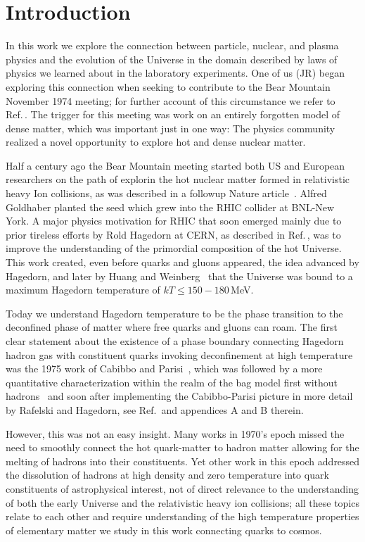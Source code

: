 \section{Introduction}
\label{sec:Intro}
In this work we explore the connection between particle, nuclear, and plasma physics and the evolution of the Universe in the domain described by laws of physics we learned about in the laboratory experiments. One of us (JR) began exploring this connection when seeking to contribute to the Bear Mountain November 1974 meeting; for further account of this circumstance we refer to Ref.\,\cite{Rafelski:2019twp}. The trigger for this meeting was work on an entirely forgotten model of dense matter, which was important just in one way: The physics community realized a novel opportunity to explore hot and dense nuclear matter.

Half a century ago the Bear Mountain meeting started both US and European researchers on the path of explorin the hot nuclear matter formed in relativistic heavy Ion collisions, as was described in a followup Nature article~\cite{Goldhaber:1978qp}. Alfred Goldhaber planted the seed which grew into the RHIC collider at BNL-New York. A  major physics motivation for RHIC that soon emerged mainly due to prior tireless efforts by Rold Hagedorn at CERN, as described in Ref.\,\cite{Rafelski:2016hnq}, was to improve  the understanding of the primordial composition of the hot Universe. This work created, even before quarks and gluons appeared, the idea advanced by Hagedorn, and later by Huang and Weinberg~\cite{Huang:1970iq} that the Universe was bound to a maximum Hagedorn temperature of $kT\le 150-180$\,MeV.

Today we understand Hagedorn temperature to be the phase transition to the deconfined phase of matter where free quarks and gluons can roam.  The first clear statement about the existence of a phase boundary connecting Hagedorn hadron gas with constituent quarks invoking deconfinement at high temperature was the 1975 work of Cabibbo and Parisi~\cite{Cabibbo:1975ig}, which was followed by a more quantitative characterization within the realm of the bag model first without hadrons~\cite{Chin:1978gj} and soon after implementing the Cabibbo-Parisi picture in more detail by Rafelski and Hagedorn, see  Ref.\,\cite{Rafelski:2015cxa} and appendices A and B therein. 

However, this was not an easy insight. Many works in 1970's epoch missed the need to smoothly connect the hot quark-matter to hadron matter allowing for the melting of hadrons into their constituents. Yet other work in this epoch addressed the dissolution of hadrons at high density and zero temperature into  quark  constituents of astrophysical interest, not of direct relevance to the understanding of both the early Universe and the relativistic heavy ion collisions; all these topics relate to each other and require understanding of the high temperature properties of elementary matter we study in this work connecting quarks to cosmos.

